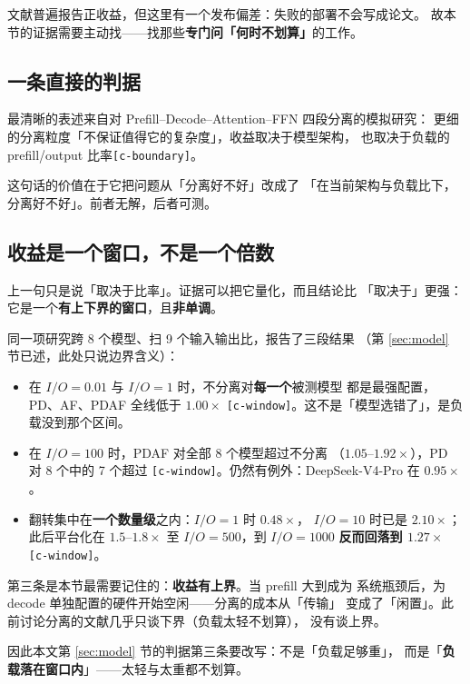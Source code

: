 文献普遍报告正收益，但这里有一个发布偏差：失败的部署不会写成论文。
故本节的证据需要主动找——找那些\textbf{专门问「何时不划算」}的工作。

\subsection{一条直接的判据}

最清晰的表述来自对 Prefill--Decode--Attention--FFN 四段分离的模拟研究：
更细的分离粒度「不保证值得它的复杂度」，收益取决于模型架构，
也取决于负载的 prefill/output 比率\texttt{[c-boundary]}。

这句话的价值在于它把问题从「分离好不好」改成了
「在当前架构与负载比下，分离好不好」。前者无解，后者可测。

\subsection{收益是一个窗口，不是一个倍数}

上一句只是说「取决于比率」。证据可以把它量化，而且结论比
「取决于」更强：它是一个\textbf{有上下界的窗口}，且\textbf{非单调}。

同一项研究跨 8 个模型、扫 9 个输入输出比，报告了三段结果
（第 \ref{sec:model} 节已述，此处只说边界含义）：

\begin{itemize}
\item 在 $I/O = 0.01$ 与 $I/O = 1$ 时，不分离对\textbf{每一个}被测模型
  都是最强配置，PD、AF、PDAF 全线低于 $1.00\times$
  \texttt{[c-window]}。这不是「模型选错了」，是负载没到那个区间。
\item 在 $I/O = 100$ 时，PDAF 对全部 8 个模型超过不分离
  （$1.05$--$1.92\times$），PD 对 8 个中的 7 个超过
  \texttt{[c-window]}。仍然有例外：DeepSeek-V4-Pro 在 $0.95\times$。
\item 翻转集中在\textbf{一个数量级}之内：$I/O=1$ 时 $0.48\times$，
  $I/O=10$ 时已是 $2.10\times$；此后平台化在 $1.5$--$1.8\times$
  至 $I/O=500$，到 $I/O=1000$ \textbf{反而回落到 $1.27\times$}
  \texttt{[c-window]}。
\end{itemize}

第三条是本节最需要记住的：\textbf{收益有上界}。当 prefill 大到成为
系统瓶颈后，为 decode 单独配置的硬件开始空闲——分离的成本从「传输」
变成了「闲置」。此前讨论分离的文献几乎只谈下界（负载太轻不划算），
没有谈上界。

因此本文第 \ref{sec:model} 节的判据第三条要改写：不是「负载足够重」，
而是「\textbf{负载落在窗口内}」——太轻与太重都不划算。

